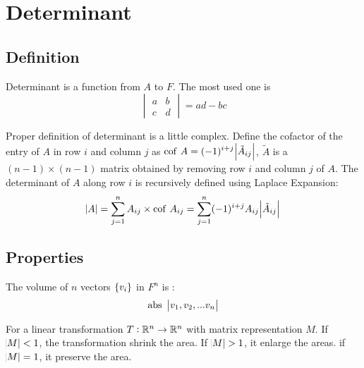 \chapter{Determinant}


\section{Definition}

Determinant is a function from $A$ to $F$. The most used one is 
\begin{equation}
    \begin{vmatrix}
        a & b \\
        c & d
    \end{vmatrix} = ad - bc
\end{equation}


Proper definition of determinant is a little complex. Define the cofactor of the entry of $A$ in row $i$ and column $j$ as $\displaystyle \mathrm{cof}~\displaystyle A = (-1)^{i+j} \abs{\tilde{A}_{ij}}$, $\tilde{A}$ is a $(n-1)\times (n-1)$ matrix obtained by removing row $i$ and column $j$ of $A$. The determinant of $A$ along row $i$ is recursively defined using Laplace Expansion:
\begin{equation}
    \abs{A} = \sum_{j=1}^n A_{ij} \times \displaystyle \mathrm{cof}~\displaystyle A_{ij} = \sum_{j=1}^n (-1)^{i+j} A_{ij}  \abs{\tilde{A}_{ij}}
\end{equation}


\section{Properties}

\begin{theorem}
    The volume of $n$ vectors $\set{v_i}$ in $F^n$ is :
    \begin{equation}
      \mathrm{abs}~\begin{vmatrix}
            v_1, v_2, ... v_n
        \end{vmatrix}
    \end{equation}
\end{theorem}

\begin{theorem}
    For a linear transformation $T: \mathbb{R}^n \rightarrow \mathbb{R}^n$ with matrix representation $M$. If $\abs{M} < 1$, the transformation shrink the area. If $\abs{M} > 1$, it enlarge the areas. if $\abs{M} = 1$, it preserve the area.
\end{theorem}


